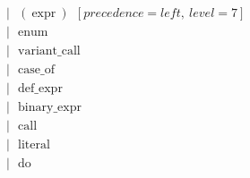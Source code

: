 \documentclass[a4paper,12pt]{book} %
\begin{document}
\begin{align*}
                                      & |\ \ \ (\ \text{expr}\ )\ \ [precedence=left,\ level=7]                                                                                                                                                                   \\
                                      & |\ \ \ \text{enum}                                                                                                                                                                                                        \\
                                      & |\ \ \ \text{variant\_call}                                                                                                                                                                                               \\
                                      & |\ \ \ \text{case\_of}                                                                                                                                                                                                    \\
                                      & |\ \ \ \text{def\_expr}                                                                                                                                                                                                   \\
                                      & |\ \ \ \text{binary\_expr}                                                                                                                                                                                                \\
                                      & |\ \ \ \text{call}                                                                                                                                                                                                        \\
                                      & |\ \ \ \text{literal}                                                                                                                                                                                                     \\
                                      & |\ \ \ \text{do}                                                                                                                                                                                                          \\

\end{align*}
\end{document}
